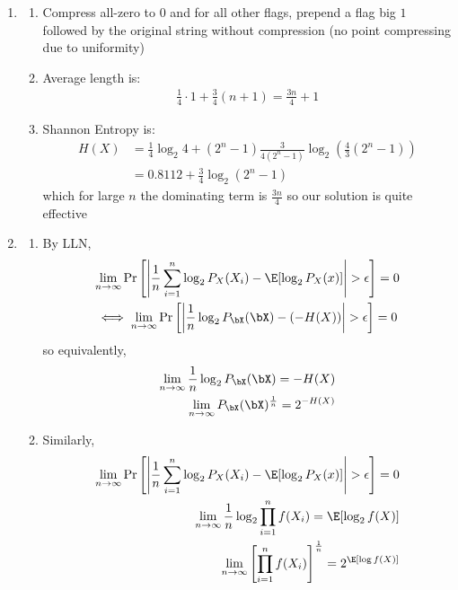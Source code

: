 \documentclass[12pt, a4paper]{article}
\begin{document}
\begin{enumerate}
  \item 
    \begin{enumerate}
      \item Compress all-zero to $0$ and for all other flags, prepend a flag big $1$ followed by the original string without compression (no point compressing due to uniformity)

      \item Average length is:
        \begin{align*}
          \frac{1}{4}\cdot 1 + \frac{3}{4}(n+1) = \frac{3n}{4} + 1
        \end{align*}

      \item Shannon Entropy is:
        \begin{align*}
          H(X) &= \frac{1}{4}\log_2 4 + (2^n-1)\frac{3}{4(2^n-1)} \log_2 (\frac{4}{3}(2^n-1))\\
               &= 0.8112 + \frac{3}{4}\log_2(2^n-1)
        \end{align*}
        which for large $n$ the dominating term is $\frac{3n}{4}$ so our solution is quite effective
    \end{enumerate}

  \item
    \begin{enumerate}
      \item By LLN,
        \begin{gather*}
          \lim_{n\to\infty}\Pr\left[\left| \frac{1}{n}\sum^n_{i=1}\log_2P_X(X_i) - \E[\log_2 P_X(x)]\right| > \epsilon \right] = 0\\
          \iff \lim_{n\to\infty}\Pr\left[\left| \frac{1}{n}\log_2 P_{\bX}(\bX) - (-H(X))\right| > \epsilon \right] = 0
        \end{gather*}
        so equivalently,
        \begin{align*}
          \lim_{n\to\infty}\frac{1}{n}\log_2P_{\bX}(\bX) = -H(X)\\ 
          \lim_{n\to\infty}P_{\bX}(\bX)^{\frac{1}{n}} = 2^{-H(X)}
        \end{align*}

      \item Similarly,
        \begin{align*}
          \lim_{n\to\infty}\Pr\left[\left| \frac{1}{n}\sum^n_{i=1}\log_2P_X(X_i) - \E[\log_2 P_X(x)]\right| > \epsilon \right] = 0\\
          \lim_{n\to\infty}\frac{1}{n}\log_2 \prod^n_{i=1}f(X_i) = \E[\log_2f(X)]\\ 
          \lim_{n\to\infty}\left[\prod^n_{i=1}f(X_i)\right]^{\frac{1}{n}} = 2^{\E[\log f(X)]}
        \end{align*}
    \end{enumerate}
\end{enumerate}
\end{document}
